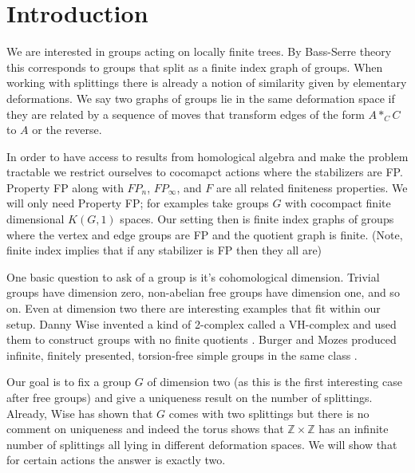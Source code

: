 \documentclass[12pt,parskip=full]{report}
\theoremstyle{plain}
\theoremstyle{definition}
\begin{document}


\chapter{Introduction}

We are interested in groups acting on locally finite trees. By Bass-Serre theory this corresponds to groups that split as a finite index graph of groups. When working with splittings there is already a notion of similarity given by elementary deformations. We say two graphs of groups lie in the same deformation space if they are related by a sequence of moves that transform edges of the form \(A*_CC\) to \(A\) or the reverse.

In order to have access to results from homological algebra and make the problem tractable we restrict ourselves to cocomapct actions where the stabilizers are FP. Property FP along with \(FP_n\), \(FP_\infty\), and \(F\) are all related finiteness properties. We will only need Property FP; for examples take groups \(G\) with cocompact finite dimensional \(K(G,1)\) spaces. Our setting then is finite index graphs of groups where the vertex and edge groups are FP and the quotient graph is finite. (Note, finite index implies that if any stabilizer is FP then they all are)

One basic question to ask of a group is it's cohomological dimension. Trivial groups have dimension zero, non-abelian free groups have dimension one, and so on. Even at dimension two there are interesting examples that fit within our setup. Danny Wise invented a kind of 2-complex called a VH-complex and used them to construct groups with no finite quotients \cite{wisethesis}. Burger and Mozes produced infinite, finitely presented, torsion-free simple groups in the same class \cite{burgermozes}.

Our goal is to fix a group \(G\) of dimension two (as this is the first interesting case after free groups) and give a uniqueness result on the number of splittings. Already, Wise has shown that \(G\) comes with two splittings but there is no comment on uniqueness and indeed the torus shows that \(\mathbb{Z}\times\mathbb{Z}\) has an infinite number of splittings all lying in different deformation spaces. We will show that for certain actions the answer is exactly two.
\end{document}
